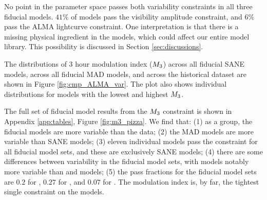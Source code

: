 No point in the parameter space passes both variability constraints in all three fiducial models.
$41\%$ of models pass the visibility amplitude constraint, and $6\%$ pass the ALMA lightcurve constraint.
One interpretation is that there is a missing physical ingredient in the models, which could affect our entire model library.
This possibility is discussed in Section \ref{sec:discussions}.


The distributions of 3 hour modulation index ($M_{3}$) across all fiducial SANE models, across all fiducial MAD models, and across the historical dataset are shown in Figure \ref{fig:cmp_ALMA_var}.
The plot also shows individual distributions for models with the lowest and highest $M_{3}$.

The full set of fiducial model results from the $M_{3}$ constraint is shown in Appendix \ref{app:tables}, Figure \ref{fig:m3_pizza}.
We find that: (1) as a group, the fiducial models are more variable than the data; (2) the MAD models are more variable than SANE models; (3) eleven individual models  pass the constraint for all fiducial model sets, and these are exclusively SANE models; (4) there are some differences between variability in the fiducial model sets, with \hamr models notably more variable than \kharma and \bhac models; (5) the pass fractions for the fiducial model sets are $0.2$ for \kharma, $0.27$ for \bhac, and $0.07$ for \hamr.
 The modulation index is, by far, the tightest single constraint on the models.


